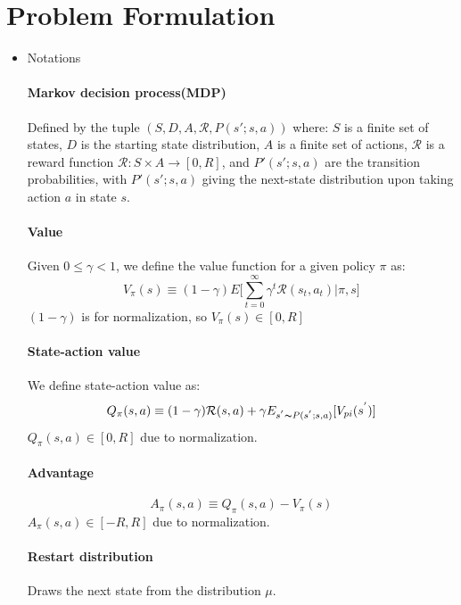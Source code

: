 \section{Problem Formulation}
\label{section:problem}
\begin{itemize}
    \item Notations
    \paragraph{Markov decision process(MDP)\\}
    Defined by the tuple $(S, D, A, \mathcal{R}, {P(s';s,a)})$ where: $S$ is a finite set of states, $D$ is the 
    starting state distribution, $A$ is a finite set of actions, $\mathcal{R}$ is a reward function $\mathcal{R}:S \times A \to [0, R]$, and ${P'(s';s,a)}$ are the transition probabilities, with ${P'(s';s,a)}$ giving the next-state distribution upon taking action $a$ in state $s$.
    
    \paragraph{Value\\}
    Given $ 0 \leqslant \gamma < 1 $, we define the value function for a given policy $\pi$ as:
    \[V_{\pi}(s) \equiv (1 - \gamma) E \bigg[\sum_{t=0}^{\infty}\gamma^{t}\mathcal{R}(s_{t},a_{t}) | \pi,s\bigg]\]
    $(1 - \gamma)$ is for normalization, so $V_{\pi}(s) \in [0,R]$
    
    
    \paragraph{State-action value \\}
    We define state-action value as:
    \[Q_{\pi}(s,a) \equiv (1 - \gamma) \mathcal{R}(s,a) + {\gamma}E_{s^{'}{\thicksim}P(s^{'};s,a)} [V_{pi}(s^{'})]\]
    $Q_{\pi}(s,a) \in [0,R]$ due to normalization.
    
    
    \paragraph{Advantage}
    \[A_{\pi}(s,a) \equiv Q_{\pi}(s,a) - V_{\pi}(s)\]
    $A_{\pi}(s,a) \in [-R, R]$ due to normalization.
    
    
    \paragraph{Restart distribution \\} Draws the next state from the distribution $\mu$.\\
    

\end{itemize}

